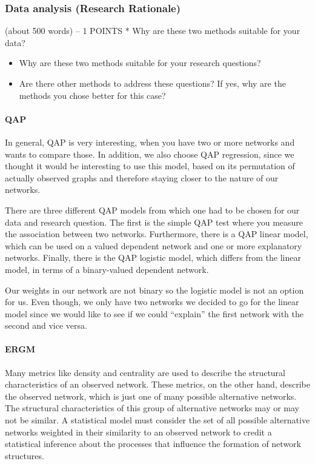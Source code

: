 \documentclass[
  man]{apa6}
\begin{document}
\hypertarget{data-analysis-research-rationale}{%
\subsubsection{Data analysis (Research
Rationale)}\label{data-analysis-research-rationale}}

(about 500 words) -- 1 POINTS * Why are these two methods suitable for
your data?

\begin{itemize}
\item
  Why are these two methods suitable for your research questions?
\item
  Are there other methods to address these questions? If yes, why are
  the methods you chose better for this case?
\end{itemize}

\hypertarget{qap}{%
\paragraph{QAP}\label{qap}}

In general, QAP is very interesting, when you have two or more networks
and wants to compare those. In addition, we also choose QAP regression,
since we thought it would be interesting to use this model, based on its
permutation of actually observed graphs and therefore staying closer to
the nature of our networks.

There are three different QAP models from which one had to be chosen for
our data and research question. The first is the simple QAP test where
you measure the association between two networks. Furthermore, there is
a QAP linear model, which can be used on a valued dependent network and
one or more explanatory networks. Finally, there is the QAP logistic
model, which differs from the linear model, in terms of a binary-valued
dependent network.

Our weights in our network are not binary so the logistic model is not
an option for us. Even though, we only have two networks we decided to
go for the linear model since we would like to see if we could
``explain'' the first network with the second and vice versa.

\hypertarget{ergm}{%
\paragraph{ERGM}\label{ergm}}

Many metrics like density and centrality are used to describe the
structural characteristics of an observed network. These metrics, on the
other hand, describe the observed network, which is just one of many
possible alternative networks. The structural characteristics of this
group of alternative networks may or may not be similar. A statistical
model must consider the set of all possible alternative networks
weighted in their similarity to an observed network to credit a
statistical inference about the processes that influence the formation
of network structures.
\end{document}
